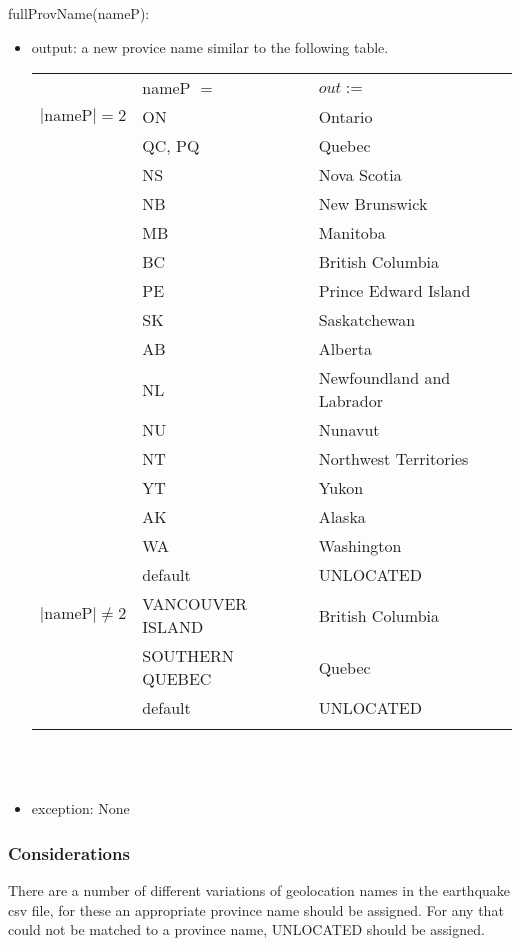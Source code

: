 \documentclass[12pt]{article}
\begin{document}
\noindent fullProvName(nameP):
\begin{itemize}
\item output: a new provice name similar to the following table.

\begin{tabular}{|p{3cm}|p{3.5cm}|l|}
\hhline{~|-|-|}
\multicolumn{1}{l|}{} & nameP $=$ & \multicolumn{1}{l|}{$out :=$}\\
\hhline{|-|-|-|}
$|\mbox{nameP}| = 2$ & ON & Ontario\\
\hhline{|~|-|-|}
 & QC, PQ & Quebec\\
\hhline{|~|-|-|}
 & NS & Nova Scotia\\
\hhline{|~|-|-|}
 & NB & New Brunswick\\
\hhline{|~|-|-|}
 & MB & Manitoba\\
\hhline{|~|-|-|}
 & BC & British Columbia\\
\hhline{|~|-|-|}
 & PE & Prince Edward Island\\
\hhline{|~|-|-|}
 & SK & Saskatchewan\\
\hhline{|~|-|-|}
 & AB & Alberta\\
\hhline{|~|-|-|}
 & NL & Newfoundland and Labrador\\
\hhline{|~|-|-|}
 & NU & Nunavut\\
\hhline{|~|-|-|}
 & NT & Northwest Territories\\
\hhline{|~|-|-|}
 & YT & Yukon\\
\hhline{|~|-|-|}
 & AK & Alaska\\
\hhline{|~|-|-|}
 & WA & Washington\\
\hhline{|~|-|-|}
 & default & UNLOCATED\\
\hhline{|-|-|-|}
$|\mbox{nameP}| \neq 2$ & VANCOUVER ISLAND & British Columbia\\
\hhline{|~|-|-|}
& SOUTHERN QUEBEC & Quebec\\
\hhline{|~|-|-|}
& default & UNLOCATED\\
\hhline{|-|-|-|}
\end{tabular}\\\\

\item exception: None
\end{itemize}

\subsubsection* {Considerations}

There are a number of different variations of geolocation names in the earthquake csv file, for these an appropriate province name
should be assigned. For any that could not be matched to a province name, UNLOCATED should be assigned.\\
\end{document}
